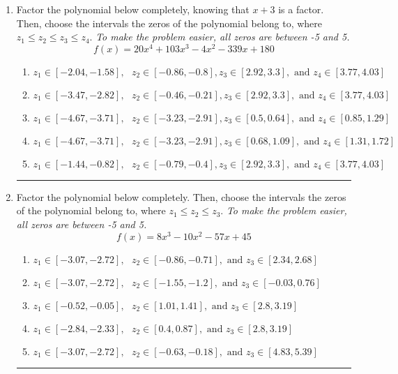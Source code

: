 \documentclass[14pt]{extbook}
\newcommand{\litem}[1]{\item#1\hspace*{-1cm}\rule{\textwidth}{0.4pt}}
\begin{document}
\begin{enumerate}
{\begin{enumerate}[label=\Alph*.]
\end{enumerate} }
\litem{
Factor the polynomial below completely, knowing that $x+3$ is a factor. Then, choose the intervals the zeros of the polynomial belong to, where $z_1 \leq z_2 \leq z_3 \leq z_4$. \textit{To make the problem easier, all zeros are between -5 and 5.}\[ f(x) = 20x^{4} +103 x^{3} -4 x^{2} -339 x + 180 \]\begin{enumerate}[label=\Alph*.]
\item \( z_1 \in [-2.04, -1.58], \text{   }  z_2 \in [-0.86, -0.8], z_3 \in [2.92, 3.3], \text{   and   } z_4 \in [3.77, 4.03] \)
\item \( z_1 \in [-3.47, -2.82], \text{   }  z_2 \in [-0.46, -0.21], z_3 \in [2.92, 3.3], \text{   and   } z_4 \in [3.77, 4.03] \)
\item \( z_1 \in [-4.67, -3.71], \text{   }  z_2 \in [-3.23, -2.91], z_3 \in [0.5, 0.64], \text{   and   } z_4 \in [0.85, 1.29] \)
\item \( z_1 \in [-4.67, -3.71], \text{   }  z_2 \in [-3.23, -2.91], z_3 \in [0.68, 1.09], \text{   and   } z_4 \in [1.31, 1.72] \)
\item \( z_1 \in [-1.44, -0.82], \text{   }  z_2 \in [-0.79, -0.4], z_3 \in [2.92, 3.3], \text{   and   } z_4 \in [3.77, 4.03] \)

\end{enumerate} }
\litem{
Factor the polynomial below completely. Then, choose the intervals the zeros of the polynomial belong to, where $z_1 \leq z_2 \leq z_3$. \textit{To make the problem easier, all zeros are between -5 and 5.}\[ f(x) = 8x^{3} -10 x^{2} -57 x + 45 \]\begin{enumerate}[label=\Alph*.]
\item \( z_1 \in [-3.07, -2.72], \text{   }  z_2 \in [-0.86, -0.71], \text{   and   } z_3 \in [2.34, 2.68] \)
\item \( z_1 \in [-3.07, -2.72], \text{   }  z_2 \in [-1.55, -1.2], \text{   and   } z_3 \in [-0.03, 0.76] \)
\item \( z_1 \in [-0.52, -0.05], \text{   }  z_2 \in [1.01, 1.41], \text{   and   } z_3 \in [2.8, 3.19] \)
\item \( z_1 \in [-2.84, -2.33], \text{   }  z_2 \in [0.4, 0.87], \text{   and   } z_3 \in [2.8, 3.19] \)
\item \( z_1 \in [-3.07, -2.72], \text{   }  z_2 \in [-0.63, -0.18], \text{   and   } z_3 \in [4.83, 5.39] \)


\end{enumerate}}
\end{enumerate}
\end{document}
